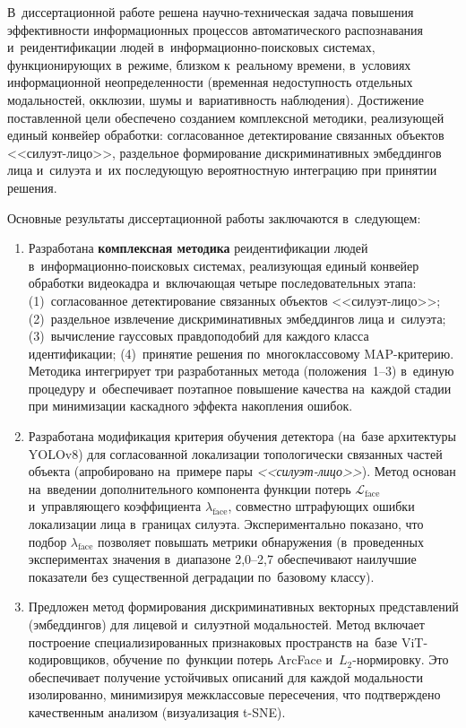 В~диссертационной работе решена научно-техническая задача повышения
эффективности информационных процессов автоматического распознавания
и~реидентификации людей в~информационно-поисковых системах, функционирующих
в~режиме, близком к~реальному времени, в~условиях информационной
неопределенности (временная недоступность отдельных модальностей, окклюзии,
шумы и~вариативность наблюдения). Достижение поставленной цели обеспечено
созданием комплексной методики, реализующей единый конвейер обработки:
согласованное детектирование связанных объектов <<силуэт-лицо>>, раздельное
формирование дискриминативных эмбеддингов лица и~силуэта и~их последующую
вероятностную интеграцию при принятии решения.

Основные результаты диссертационной работы заключаются в~следующем:

\begin{enumerate}
    \item Разработана \textbf{комплексная методика} реидентификации людей
    в~информационно-поисковых системах, реализующая единый конвейер
    обработки видеокадра и~включающая четыре последовательных этапа:
    (1)~согласованное детектирование связанных объектов <<силуэт-лицо>>;
    (2)~раздельное извлечение дискриминативных эмбеддингов лица и~силуэта;
    (3)~вычисление гауссовых правдоподобий для каждого класса
    идентификации; (4)~принятие решения по~многоклассовому MAP-критерию.
    Методика интегрирует три разработанных метода (положения~1--3)
    в~единую процедуру и~обеспечивает поэтапное повышение качества
    на~каждой стадии при минимизации каскадного эффекта накопления ошибок.

    \item Разработана модификация критерия обучения детектора (на~базе
    архитектуры YOLOv8) для согласованной локализации топологически связанных
    частей объекта (апробировано на~примере пары \textit{<<силуэт-лицо>>}).
    Метод основан на~введении дополнительного компонента функции потерь
    $\mathcal{L}_{\text{face}}$ и~управляющего коэффициента
    $\lambda_{\text{face}}$, совместно штрафующих ошибки локализации
    лица в~границах силуэта. Экспериментально показано, что подбор
    $\lambda_{\text{face}}$ позволяет повышать метрики обнаружения
    (в~проведенных экспериментах значения в~диапазоне 2,0--2,7 обеспечивают
    наилучшие показатели без существенной деградации по~базовому
    классу).

    \item Предложен метод формирования дискриминативных векторных представлений
    (эмбеддингов) для лицевой и~силуэтной модальностей. Метод включает
    построение специализированных признаковых пространств на~базе ViT-кодировщиков,
    обучение по~функции потерь ArcFace и~$L_2$-нормировку.
    Это обеспечивает получение устойчивых описаний для каждой модальности
    изолированно, минимизируя межклассовые пересечения, что подтверждено
    качественным анализом (визуализация t-SNE).


\end{enumerate}
